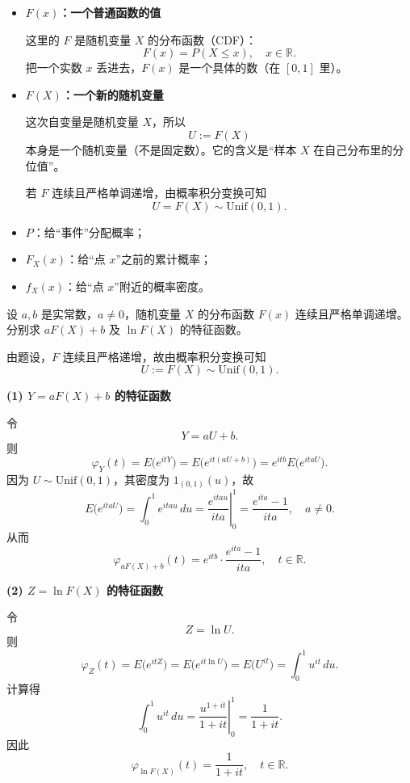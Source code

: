 \begin{dxtips}
    \begin{itemize}
  \item \textbf{$F(x)$：一个普通函数的值}

  这里的 $F$ 是随机变量 $X$ 的分布函数（CDF）：
  \[
    F(x)=P(X\le x),\quad x\in\mathbb{R}.
  \]
  把一个实数 $x$ 丢进去，$F(x)$ 是一个具体的数（在 $[0,1]$ 里）。

  \item \textbf{$F(X)$：一个新的随机变量}

  这次自变量是随机变量 $X$，所以
  \[
    U := F(X)
  \]
  本身是一个随机变量（不是固定数）。它的含义是“样本 $X$ 在自己分布里的分位值”。

  若 $F$ 连续且严格单调递增，由概率积分变换可知
  \[
    U = F(X)\sim \mathrm{Unif}(0,1).
  \]
\end{itemize}

\end{dxtips}
\begin{dxtips}
    \begin{itemize}
  \item $P$：给“事件”分配概率；
  \item $F_X(x)$：给“点 $x$”之前的累计概率；
  \item $f_X(x)$：给“点 $x$”附近的概率密度。
\end{itemize}
\end{dxtips}
\begin{homework}[4.7]
设 $a,b$ 是实常数，$a\neq 0$，随机变量 $X$ 的分布函数 $F(x)$ 连续且严格单调递增。分别求 $aF(X)+b$ 及 $\ln F(X)$ 的特征函数。
\end{homework}
\begin{solution}
由题设，$F$ 连续且严格递增，故由概率积分变换可知
\[
U:=F(X)\sim \mathrm{Unif}(0,1).
\]

\medskip
\noindent\textbf{(1) $Y=aF(X)+b$ 的特征函数}

令
\[
Y=aU+b.
\]
则
\[
\varphi_Y(t)
=E\bigl(e^{itY}\bigr)
=E\bigl(e^{it(aU+b)}\bigr)
=e^{itb}E\bigl(e^{itaU}\bigr).
\]
因为 $U\sim\mathrm{Unif}(0,1)$，其密度为 $1_{(0,1)}(u)$，故
\[
E\bigl(e^{itaU}\bigr)
=\int_0^1 e^{ita u}\,du
=\left.\frac{e^{ita u}}{ita}\right|_{0}^{1}
=\frac{e^{ita}-1}{ita},\quad a\neq 0.
\]
从而
\[
\boxed{\displaystyle
\varphi_{aF(X)+b}(t)
=e^{itb}\cdot\frac{e^{ita}-1}{ita},\quad t\in\mathbb{R}.}
\]

\medskip
\noindent\textbf{(2) $Z=\ln F(X)$ 的特征函数}

令
\[
Z=\ln U.
\]
则
\[
\varphi_Z(t)
=E\bigl(e^{itZ}\bigr)
=E\bigl(e^{it\ln U}\bigr)
=E\bigl(U^{it}\bigr)
=\int_0^1 u^{it}\,du.
\]
计算得
\[
\int_0^1 u^{it}\,du
=\left.\frac{u^{1+it}}{1+it}\right|_{0}^{1}
=\frac{1}{1+it}.
\]
因此
\[
\boxed{\displaystyle
\varphi_{\ln F(X)}(t)=\frac{1}{1+it},\quad t\in\mathbb{R}.}
\]

\end{solution}
